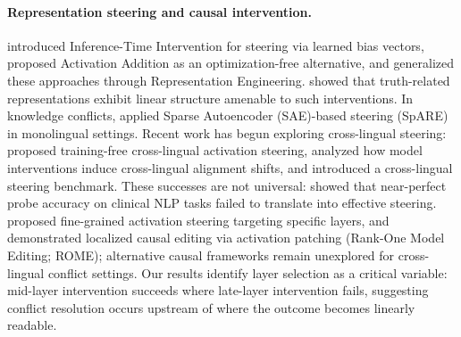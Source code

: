 \paragraph{Representation steering and causal intervention.}
\citet{li2023iti} introduced Inference-Time Intervention for steering via learned bias vectors, \citet{turner2023activation} proposed Activation Addition as an optimization-free alternative, and \citet{zou2023representation} generalized these approaches through Representation Engineering.
\citet{marks2024geometry} showed that truth-related representations exhibit linear structure amenable to such interventions.
In knowledge conflicts, \citet{zhao2025steering} applied Sparse Autoencoder (SAE)-based steering (SpARE) in monolingual settings.
Recent work has begun exploring cross-lingual steering: \citet{pokharel2026crosslingual} proposed training-free cross-lingual activation steering, \citet{sundar2025steering} analyzed how model interventions induce cross-lingual alignment shifts, and \citet{gurgurov2026clasbench} introduced a cross-lingual steering benchmark.
These successes are not universal: \citet{basu2026interpretability} showed that near-perfect probe accuracy on clinical NLP tasks failed to translate into effective steering.
\citet{feng2026finegrained} proposed fine-grained activation steering targeting specific layers, and \citet{meng2022locating} demonstrated localized causal editing via activation patching (Rank-One Model Editing; ROME); alternative causal frameworks \citep{geiger2024finding} remain unexplored for cross-lingual conflict settings.
Our results identify layer selection as a critical variable: mid-layer intervention succeeds where late-layer intervention fails, suggesting conflict resolution occurs upstream of where the outcome becomes linearly readable.